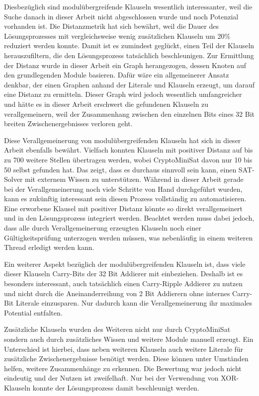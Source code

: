 Diesbezüglich sind modulübergreifende Klauseln wesentlich interessanter, weil die Suche danach in dieser Arbeit nicht abgeschlossen wurde und noch
Potenzial vorhanden ist. Die Distanzmetrik hat sich bewährt, weil die Dauer des Lösungsprozesses mit vergleichsweise wenig zusätzlichen Klauseln um
20\% reduziert werden konnte. Damit ist es zumindest geglückt, einen Teil der Klauseln herauszufiltern, die den Lösungsprozess tatsächlich
beschleunigen. Zur Ermittlung der Distanz wurde in dieser Arbeit ein Graph herangezogen, dessen Knoten auf den grundlegenden Module basieren.
Dafür wäre ein allgemeinerer Ansatz denkbar, der einen Graphen anhand der Literale und Klauseln erzeugt, um darauf eine Distanz zu ermitteln.
Dieser Graph wird jedoch wesentlich umfangreicher und hätte es in dieser Arbeit erschwert die gefundenen Klauseln zu verallgemeinern, weil
der Zusammenhang zwischen den einzelnen Bits eines 32 Bit breiten Zwischenergebnisses verloren geht.

Diese Verallgemeinerung von modulübergreifenden Klauseln hat sich in dieser Arbeit ebenfalls bewährt. Vielfach konnten Klauseln mit positiver
Distanz auf bis zu 700 weitere Stellen übertragen werden, wobei CryptoMiniSat davon nur 10 bis 50 selbst gefunden hat. Das zeigt, dass es
durchaus sinnvoll sein kann, einen SAT-Solver mit externem Wissen zu unterstützen. Während in dieser Arbeit gerade bei der Verallgemeinerung
noch viele Schritte von Hand durchgeführt wurden, kann es zukünftig interessant sein diesen Prozess vollständig zu automatisieren. Eine
erworbene Klausel mit positiver Distanz könnte so direkt verallgemeinert und in den Lösungsprozess integriert werden. Beachtet werden muss
dabei jedoch, dass alle durch Verallgemeinerung erzeugten Klauseln noch einer Gültigkeitsprüfung unterzogen werden müssen, was nebenläufig in
einem weiteren Thread erledigt werden kann.

Ein weiterer Aspekt bezüglich der modulübergreifenden Klauseln ist, dass viele dieser Klauseln Carry-Bits der 32 Bit Addierer mit einbeziehen.
Deshalb ist es besonders interessant, auch tatsächlich einen Carry-Ripple Addierer zu nutzen und nicht durch die Aneinanderreihung von 2 Bit
Addierern ohne internes Carry-Bit Literale einzusparen. Nur dadurch kann die Verallgemeinerung ihr maximales Potential entfalten.

Zusätzliche Klauseln wurden des Weiteren nicht nur durch CryptoMiniSat sondern auch durch zusätzliches Wissen und weitere Module manuell erzeugt.
Ein Unterschied ist hierbei, dass neben weiteren Klauseln auch weitere Literale für zusätzliche Zwischenergebnisse benötigt werden.
Diese können unter Umständen helfen, weitere Zusammenhänge zu erkennen. Die Bewertung war jedoch nicht eindeutig und der Nutzen ist zweifelhaft.
Nur bei der Verwendung von XOR-Klauseln konnte der Lösungsprozess damit beschleunigt werden.

